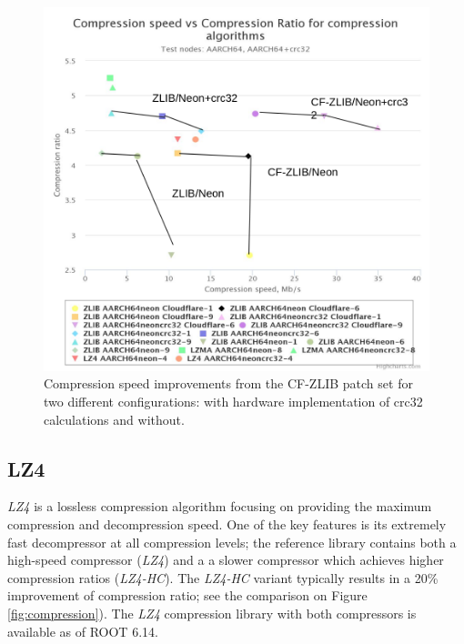 \documentclass[12pt]{iopart}
\begin{document}
\begin{figure}[!ht]
\centering
\includegraphics[width=0.7\linewidth]{acat31.png}
\caption{Compression speed improvements from the CF-ZLIB patch set for two different configurations: with hardware implementation of crc32 calculations and without.}
\label{fig:cfneon}
\end{figure}

\subsection{LZ4}

\textit{LZ4} is a lossless compression algorithm focusing on providing the maximum compression and decompression speed. One of the key features is its extremely fast decompressor at all compression levels; the reference library contains both a high-speed compressor (\textit{LZ4}) and a a slower compressor which achieves higher compression ratios (\textit{LZ4-HC}).  The \textit{LZ4-HC} variant typically results in a 20\% improvement of compression ratio; see the comparison on Figure \ref{fig:compression}).  The \textit{LZ4} compression library with both compressors is available as of ROOT 6.14. 

\end{document}
